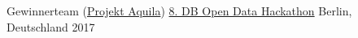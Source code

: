 



\begin{cvhonors}

  \cvhonor
    {Gewinnerteam (\href{https://github.com/dbhack-aquila/aquila}{\faGithub\acvHeaderIconSep Projekt Aquila})} %
    {\href{https://dbmindbox.com/en/db-opendata-hackathons/hackathons/hackathon-8-db-open-data/}{8. DB Open Data Hackathon}} %
    {Berlin, Deutschland} %
    {2017} %

\end{cvhonors}
